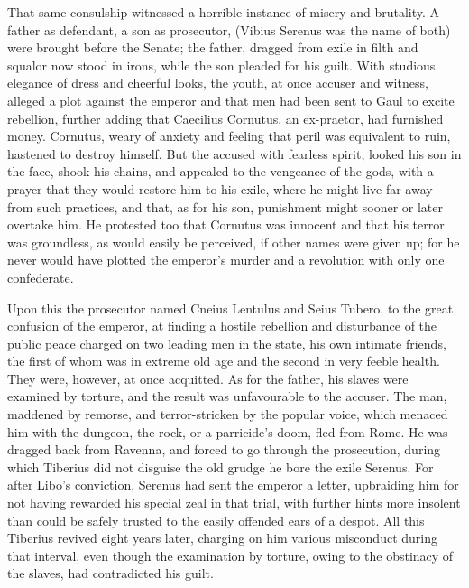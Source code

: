 That same consulship witnessed a horrible instance of misery and brutality. A father as defendant, a son as prosecutor, (Vibius Serenus was the name of both) were brought before the Senate; the father, dragged from exile in filth and squalor now stood in irons, while the son pleaded for his guilt. With studious elegance of dress and cheerful looks, the youth, at once accuser and witness, alleged a plot against the emperor and that men had been sent to Gaul to excite rebellion, further adding that Caecilius Cornutus, an ex-praetor, had furnished money. Cornutus, weary of anxiety and feeling that peril was equivalent to ruin, hastened to destroy himself. But the accused with fearless spirit, looked his son in the face, shook his chains, and appealed to the vengeance of the gods, with a prayer that they would restore him to his exile, where he might live far away from such practices, and that, as for his son, punishment might sooner or later overtake him. He protested too that Cornutus was innocent and that his terror was groundless, as would easily be perceived, if other names were given up; for he never would have plotted the emperor's murder and a revolution with only one confederate.


Upon this the prosecutor named Cneius Lentulus and Seius Tubero, to the great confusion of the emperor, at finding a hostile rebellion and disturbance of the public peace charged on two leading men in the state, his own intimate friends, the first of whom was in extreme old age and the second in very feeble health. They were, however, at once acquitted. As for the father, his slaves were examined by torture, and the result was unfavourable to the accuser. The man, maddened by remorse, and terror-stricken by the popular voice, which menaced him with the dungeon, the rock, or a parricide's doom, fled from Rome. He was dragged back from Ravenna, and forced to go through the prosecution, during which Tiberius did not disguise the old grudge he bore the exile Serenus. For after Libo's conviction, Serenus had sent the emperor a letter, upbraiding him for not having rewarded his special zeal in that trial, with further hints more insolent than could be safely trusted to the easily offended ears of a despot. All this Tiberius revived eight years later, charging on him various misconduct during that interval, even though the examination by torture, owing to the obstinacy of the slaves, had contradicted his guilt.


